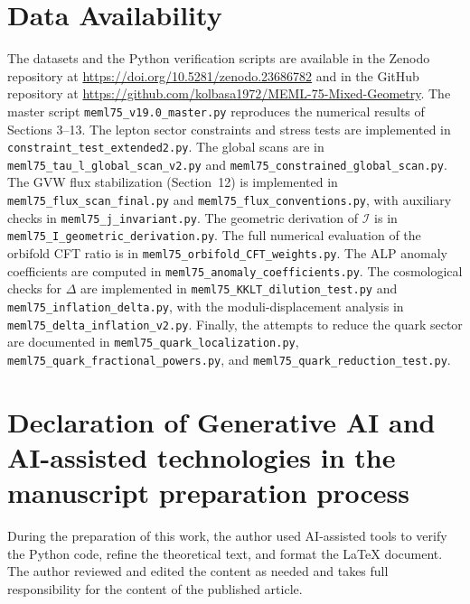 \documentclass[12pt,a4paper]{article}
\numberwithin{equation}{section}
\begin{document}
\section*{Data Availability}
The datasets and the Python verification scripts are available in the Zenodo repository at \url{https://doi.org/10.5281/zenodo.23686782} and in the GitHub repository at \url{https://github.com/kolbasa1972/MEML-75-Mixed-Geometry}. The master script \texttt{meml75\_v19.0\_master.py} reproduces the numerical results of Sections 3--13. The lepton sector constraints and stress tests are implemented in \texttt{constraint\_test\_extended2.py}. The global scans are in \texttt{meml75\_tau\_l\_global\_scan\_v2.py} and \texttt{meml75\_constrained\_global\_scan.py}. The GVW flux stabilization (Section~12) is implemented in \texttt{meml75\_flux\_scan\_final.py} and \texttt{meml75\_flux\_conventions.py}, with auxiliary checks in \texttt{meml75\_j\_invariant.py}. The geometric derivation of \(\mathcal{I}\) is in \texttt{meml75\_I\_geometric\_derivation.py}. The full numerical evaluation of the orbifold CFT ratio is in \texttt{meml75\_orbifold\_CFT\_weights.py}. The ALP anomaly coefficients are computed in \texttt{meml75\_anomaly\_coefficients.py}. The cosmological checks for \(\Delta\) are implemented in \texttt{meml75\_KKLT\_dilution\_test.py} and \texttt{meml75\_inflation\_delta.py}, with the moduli-displacement analysis in \texttt{meml75\_delta\_inflation\_v2.py}. Finally, the attempts to reduce the quark sector are documented in \texttt{meml75\_quark\_localization.py}, \texttt{meml75\_quark\_fractional\_powers.py}, and \texttt{meml75\_quark\_reduction\_test.py}.

\section*{Declaration of Generative AI and AI-assisted technologies in the manuscript preparation process}
During the preparation of this work, the author used AI-assisted tools to verify the Python code, refine the theoretical text, and format the LaTeX document. The author reviewed and edited the content as needed and takes full responsibility for the content of the published article.
\end{document}
